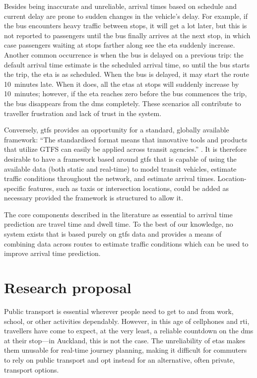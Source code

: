 Besides being inaccurate and unreliable, arrival times based on schedule and current delay are prone to sudden changes in the vehicle's delay. For example, if the bus encounters heavy traffic between stops, it will get a lot later, but this is not reported to passengers until the bus finally arrives at the next stop, in which case passengers waiting at stops farther along see the \gls{eta} suddenly increase. Another common occurrence is when the bus is delayed on a previous trip: the default arrival time estimate is the scheduled arrival time, so until the bus starts the trip, the \gls{eta} is as scheduled. When the bus is delayed, it may start the route 10~minutes late. When it does, all the \glspl{eta} at stops will suddenly increase by 10~minutes; however, if the \gls{eta} reaches zero before the bus commences the trip, the bus disappears from the \gls{dms} completely. These scenarios all contribute to traveller frustration and lack of trust in the system.


Conversely, \gls{gtfs} provides an opportunity for a standard, globally available framework: ``The standardised format means that innovative tools and products that utilize GTFS can easily be applied across transit agencies.'' \citep[26]{TCRP_2020}. It is therefore desirable to have a framework based around \gls{gtfs} that is capable of using the available data (both static and real-time) to model transit vehicles, estimate traffic conditions throughout the network, and estimate arrival times. Location-specific features, such as taxis or intersection locations, could be added as necessary provided the framework is structured to allow it.


The core components described in the literature as essential to arrival time prediction are travel time and dwell time. To the best of our knowledge, no system exists that is based purely on \gls{gtfs} data and provides a means of combining data across routes to estimate traffic conditions which can be used to improve arrival time prediction.



\section{Research proposal}
\label{sec:proposal}

Public transport is essential wherever people need to get to and from work, school, or other activities dependably. However, in this age of cellphones and \gls{rti}, travellers have come to expect, at the very least, a reliable countdown on the \gls{dms} at their stop---in Auckland, this is not the case. The unreliability of \glspl{eta} makes them unusable for real-time journey planning, making it difficult for commuters to rely on public transport and opt instead for an alternative, often private, transport options.


